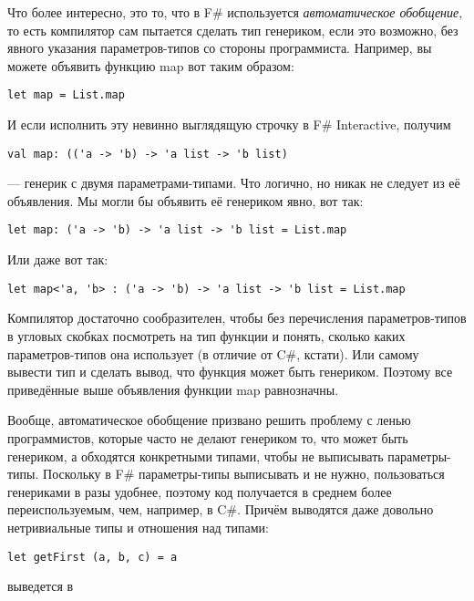 \documentclass[a5paper]{article}
\begin{document}
Что более интересно, это то, что в F\# используется \emph{автоматическое обобщение}, то есть компилятор сам пытается сделать тип генериком, если это возможно, без явного указания параметров-типов со стороны программиста. Например, вы можете объявить функцию map вот таким образом:

\begin{verbatim}
let map = List.map
\end{verbatim}

И если исполнить эту невинно выглядящую строчку в F\# Interactive, получим

\begin{verbatim}
val map: (('a -> 'b) -> 'a list -> 'b list)
\end{verbatim}

--- генерик с двумя параметрами-типами. Что логично, но никак не следует из её объявления. Мы могли бы объявить её генериком явно, вот так: 

\begin{verbatim}
let map: ('a -> 'b) -> 'a list -> 'b list = List.map
\end{verbatim}

Или даже вот так:

\begin{verbatim}
let map<'a, 'b> : ('a -> 'b) -> 'a list -> 'b list = List.map
\end{verbatim}

Компилятор достаточно сообразителен, чтобы без перечисления параметров-типов в угловых скобках посмотреть на тип функции и понять, сколько каких параметров-типов она использует (в отличие от C\#, кстати). Или самому вывести тип и сделать вывод, что функция может быть генериком. Поэтому все приведённые выше объявления функции map равнозначны.

Вообще, автоматическое обобщение призвано решить проблему с ленью программистов, которые часто не делают генериком то, что может быть генериком, а обходятся конкретными типами, чтобы не выписывать параметры-типы. Поскольку в F\# параметры-типы выписывать и не нужно, пользоваться генериками в разы удобнее, поэтому код получается в среднем более переиспользуемым, чем, например, в C\#. Причём выводятся даже довольно нетривиальные типы и отношения над типами:

\begin{verbatim}
let getFirst (a, b, c) = a
\end{verbatim}

выведется в 
\end{document}
